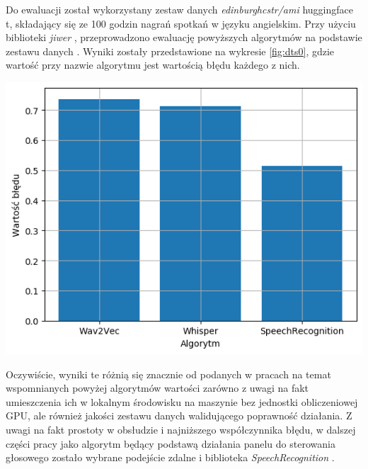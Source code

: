 Do ewaluacji został wykorzystany zestaw danych \textit{edinburghcstr/ami} huggingface t\cite{dataset-eval}, składający się ze 100 godzin nagrań spotkań w języku angielskim. Przy użyciu biblioteki \textit{jiwer} \cite{jiwer}, przeprowadzono ewaluację powyższych algorytmów na podstawie zestawu danych \cite{dataset-eval}. Wyniki zostały przedstawione na wykresie \ref{fig:dts0}, gdzie wartość przy nazwie algorytmu jest wartością błędu każdego z nich.
\begin{center}
    \includegraphics[width=0.7\linewidth]{files/output0.png}
    \label{fig:dts0}
\end{center}

Oczywiście, wyniki te różnią się znacznie od podanych w pracach na temat wspomnianych powyżej algorytmów wartości zarówno z uwagi na fakt umieszczenia ich w lokalnym środowisku na maszynie bez jednostki obliczeniowej GPU, ale również jakości zestawu danych walidującego poprawność działania. Z uwagi na fakt prostoty w obsłudzie i najniższego współczynnika błędu, w dalszej części pracy jako algorytm będący podstawą działania panelu do sterowania głosowego zostało wybrane podejście zdalne i biblioteka \textit{SpeechRecognition} \cite{speechrec}.